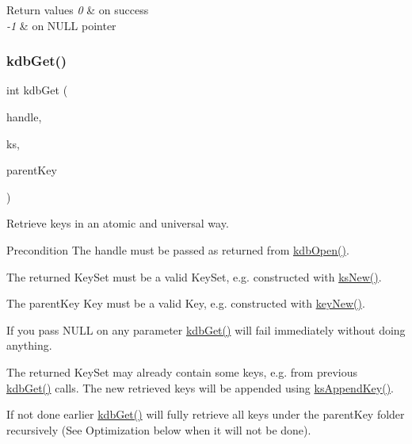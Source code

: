 \begin{DoxyRetVals}{Return values}
{\em 0} & on success \\
\hline
{\em -\/1} & on N\+U\+LL pointer \\
\hline
\end{DoxyRetVals}
\mbox{\label{group__kdb_ga28e385fd9cb7ccfe0b2f1ed2f62453a1}} 
\subsubsection{\texorpdfstring{kdb\+Get()}{kdbGet()}}
{\footnotesize\ttfamily int kdb\+Get (\begin{DoxyParamCaption}\item[{K\+DB $\ast$}]{handle,  }\item[{Key\+Set $\ast$}]{ks,  }\item[{Key $\ast$}]{parent\+Key }\end{DoxyParamCaption})}



Retrieve keys in an atomic and universal way. 

\begin{DoxyPrecond}{Precondition}
The {\ttfamily handle} must be passed as returned from \hyperlink{group__kdb_ga6808defe5870f328dd17910aacbdc6ca}{kdb\+Open()}.

The {\ttfamily returned} Key\+Set must be a valid Key\+Set, e.\+g. constructed with \hyperlink{group__keyset_ga671e1aaee3ae9dc13b4834a4ddbd2c3c}{ks\+New()}.

The {\ttfamily parent\+Key} Key must be a valid Key, e.\+g. constructed with \hyperlink{group__key_gad23c65b44bf48d773759e1f9a4d43b89}{key\+New()}.
\end{DoxyPrecond}
If you pass N\+U\+LL on any parameter \hyperlink{group__kdb_ga28e385fd9cb7ccfe0b2f1ed2f62453a1}{kdb\+Get()} will fail immediately without doing anything.

The {\ttfamily returned} Key\+Set may already contain some keys, e.\+g. from previous \hyperlink{group__kdb_ga28e385fd9cb7ccfe0b2f1ed2f62453a1}{kdb\+Get()} calls. The new retrieved keys will be appended using \hyperlink{group__keyset_gaa5a1d467a4d71041edce68ea7748ce45}{ks\+Append\+Key()}.

If not done earlier \hyperlink{group__kdb_ga28e385fd9cb7ccfe0b2f1ed2f62453a1}{kdb\+Get()} will fully retrieve all keys under the {\ttfamily parent\+Key} folder recursively (See Optimization below when it will not be done).

